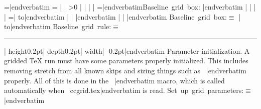 \verbatim
\ccgrid@prevoutput=\expandafter{\the\output}|endverbatim\6
\verbatim
\output={%|endverbatim\6
\verbatim
| | \ifnum\ccgridloglevel>0%|endverbatim\6
\verbatim
| | | | =|endverbatim\setbox\cctanglebox\hbox{Baseline grid box}:\box\cctanglebox\X\verbatim
|endverbatim\6
\verbatim
| | | | =\vbox| to|endverbatim\6
\verbatim
| | \fi|endverbatim\6
\verbatim
| | \the\ccgrid@prevoutput}|endverbatim\6
\fi
{}\B\4\setbox\cctanglebox\hbox{Baseline grid box}:\box\cctanglebox\X${}\equiv{}$\6
\verbatim
\vbox| to|endverbatim\6
\fi
{}\B\4\setbox\cctanglebox\hbox{Baseline grid rule}:\box\cctanglebox\X${}\equiv{}$\6
\verbatim
\kern-0.2pt\hrule| height0.2pt| depth0.2pt| width\hsize\kern| -0.2pt|endverbatim\6
\fi
{}Parameter initialization.
A gridded \TeX{} run must have some parameters properly initialized.
This includes removing stretch from all known skips and sizing things
such as \hbox{\verbatim
\vsize|endverbatim}{} properly. All of this is done in the \hbox{\verbatim
\ccgridsetup|endverbatim}{}
macro, which is called automatically when \hbox{\verbatim
ccgrid.tex|endverbatim}{} is read.
\Y\B\4\setbox\cctanglebox\hbox{Set up grid parameters}:\box\cctanglebox\X${}\equiv{}$\6
\verbatim
\def\ccgridsetup{|endverbatim\6
\verbatim
| | |endverbatim\setbox\cctanglebox\hbox{Remove glue from \hbox{\verbatim
\baselineskip|endverbatim}{} and set the Lua grid}\X28:\box\cctanglebox\X\verbatim
|endverbatim\6
\verbatim
| | |endverbatim\setbox\cctanglebox\hbox{Remove glue from other \TeX{} skips}\X29:\box\cctanglebox\X\verbatim
|endverbatim\6
\verbatim
| | |endverbatim\setbox\cctanglebox\hbox{Set \hbox{\verbatim
\vsize|endverbatim}{} to a multiple of \hbox{\verbatim
\baselineskip|endverbatim}{}}\X30:\box\cctanglebox\X\verbatim
|endverbatim\6
\verbatim
| | |endverbatim\setbox\cctanglebox\hbox{Set \hbox{\verbatim
\lineskip|endverbatim}{} and \hbox{\verbatim
\lineskiplimit|endverbatim}{}}\X31:\box\cctanglebox\X\verbatim
|endverbatim\6
\verbatim
| | \raggedbottom%
\verbatim
}|endverbatim\6
